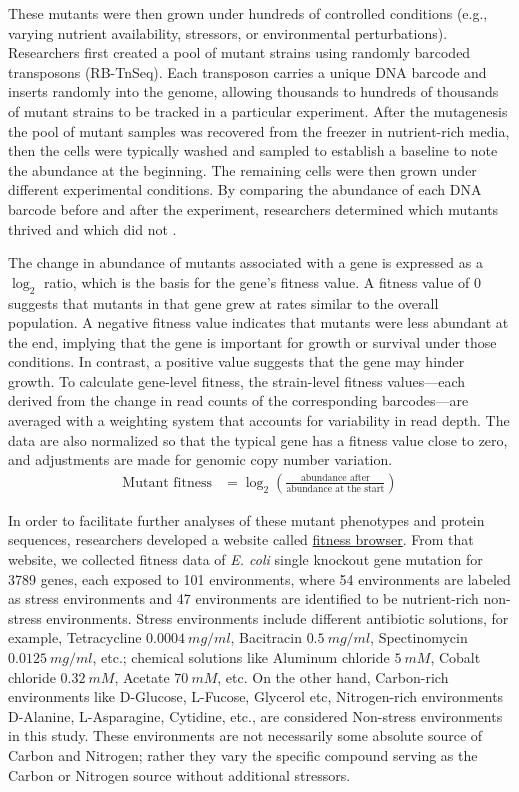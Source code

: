 \documentclass[11pt]{article}
\begin{document}
These mutants were then grown under hundreds of controlled conditions (e.g., varying nutrient availability, stressors, or environmental perturbations). Researchers first created a pool of mutant strains using randomly barcoded transposons (RB-TnSeq). Each transposon carries a unique DNA barcode and inserts randomly into the genome, allowing thousands to hundreds of thousands of mutant strains to be tracked in a particular experiment. After the mutagenesis the pool of mutant samples was recovered from the freezer in nutrient-rich media, then the cells were typically washed and sampled to establish a baseline to note the abundance at the beginning. The remaining cells were then grown under different experimental conditions. By comparing the abundance of each DNA barcode before and after the experiment, researchers determined which mutants thrived and which did not \cite{wetmore2015rapid}.

The change in abundance of mutants associated with a gene is expressed as a $\log_2$ ratio, which is the basis for the gene's fitness value. A fitness value of 0 suggests that mutants in that gene grew at rates similar to the overall population. A negative fitness value indicates that mutants were less abundant at the end, implying that the gene is important for growth or survival under those conditions. In contrast, a positive value suggests that the gene may hinder growth. To calculate gene-level fitness, the strain-level fitness values—each derived from the change in read counts of the corresponding barcodes—are averaged with a weighting system that accounts for variability in read depth. The data are also normalized so that the typical gene has a fitness value close to zero, and adjustments are made for genomic copy number variation.
\begin{align*}
    \text{Mutant fitness} &= \log_2\left( \frac{\text{abundance after}}{\text{abundance at the start}} \right) \tag{1}
\end{align*}

In order to facilitate further analyses of these mutant phenotypes and protein sequences, researchers developed a website called \href{https://fit.genomics.lbl.gov/cgi-bin/myFrontPage.cgi}{fitness browser}. From that website, we collected fitness data of \textit{E. coli} single knockout gene mutation for 3789 genes, each exposed to 101 environments, where 54 environments are labeled as stress environments and 47 environments are identified to be nutrient-rich non-stress environments. Stress environments include different antibiotic solutions, for example, Tetracycline $0.0004 \ mg/ml$, Bacitracin $0.5 \ mg / ml$, Spectinomycin $0.0125 \ mg/ml$, etc.; chemical solutions like Aluminum chloride $5 \ mM$, Cobalt chloride $0.32 \ mM$, Acetate $70 \ mM$, etc. On the other hand, Carbon-rich environments like D-Glucose, L-Fucose, Glycerol etc, Nitrogen-rich environments D-Alanine, L-Asparagine, Cytidine, etc., are considered Non-stress environments in this study. These environments are not necessarily some absolute source of Carbon and Nitrogen; rather they vary the specific compound serving as the Carbon or Nitrogen source without additional stressors.
\end{document}
